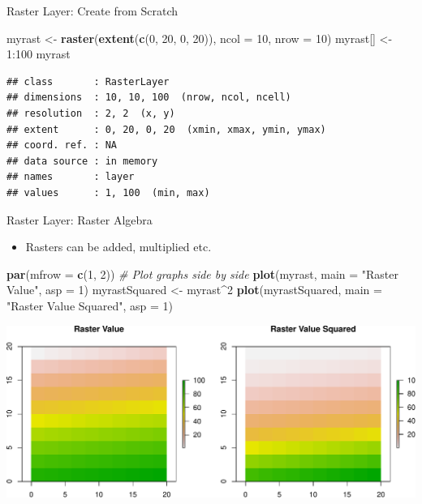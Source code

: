 \documentclass[10pt,ignorenonframetext,]{beamer}
\newenvironment{Shaded}{\begin{snugshade}}{\end{snugshade}}
\newcommand{\KeywordTok}[1]{\textcolor[rgb]{0.13,0.29,0.53}{\textbf{{#1}}}}
\newcommand{\DataTypeTok}[1]{\textcolor[rgb]{0.13,0.29,0.53}{{#1}}}
\newcommand{\DecValTok}[1]{\textcolor[rgb]{0.00,0.00,0.81}{{#1}}}
\newcommand{\StringTok}[1]{\textcolor[rgb]{0.31,0.60,0.02}{{#1}}}
\newcommand{\CommentTok}[1]{\textcolor[rgb]{0.56,0.35,0.01}{\textit{{#1}}}}
\newcommand{\NormalTok}[1]{{#1}}
\providecommand{\tightlist}{%
  \setlength{\itemsep}{0pt}\setlength{\parskip}{0pt}}
\begin{document}
\begin{frame}[fragile]{Raster Layer: Create from Scratch}

\begin{Shaded}
\begin{Highlighting}[]
\NormalTok{myrast <-}\StringTok{ }\KeywordTok{raster}\NormalTok{(}\KeywordTok{extent}\NormalTok{(}\KeywordTok{c}\NormalTok{(}\DecValTok{0}\NormalTok{, }\DecValTok{20}\NormalTok{, }\DecValTok{0}\NormalTok{, }\DecValTok{20}\NormalTok{)), }\DataTypeTok{ncol =} \DecValTok{10}\NormalTok{, }
    \DataTypeTok{nrow =} \DecValTok{10}\NormalTok{)}
\NormalTok{myrast[] <-}\StringTok{ }\DecValTok{1}\NormalTok{:}\DecValTok{100}
\NormalTok{myrast}
\end{Highlighting}
\end{Shaded}

\begin{verbatim}
## class       : RasterLayer 
## dimensions  : 10, 10, 100  (nrow, ncol, ncell)
## resolution  : 2, 2  (x, y)
## extent      : 0, 20, 0, 20  (xmin, xmax, ymin, ymax)
## coord. ref. : NA 
## data source : in memory
## names       : layer 
## values      : 1, 100  (min, max)
\end{verbatim}

\end{frame}

\begin{frame}[fragile]{Raster Layer: Raster Algebra}

\begin{itemize}
\tightlist
\item
  Rasters can be added, multiplied etc.
\end{itemize}

\begin{Shaded}
\begin{Highlighting}[]
\KeywordTok{par}\NormalTok{(}\DataTypeTok{mfrow =} \KeywordTok{c}\NormalTok{(}\DecValTok{1}\NormalTok{, }\DecValTok{2}\NormalTok{))  }\CommentTok{# Plot graphs side by side}
\KeywordTok{plot}\NormalTok{(myrast, }\DataTypeTok{main =} \StringTok{"Raster Value"}\NormalTok{, }\DataTypeTok{asp =} \DecValTok{1}\NormalTok{)}
\NormalTok{myrastSquared <-}\StringTok{ }\NormalTok{myrast^}\DecValTok{2}
\KeywordTok{plot}\NormalTok{(myrastSquared, }\DataTypeTok{main =} \StringTok{"Raster Value Squared"}\NormalTok{, }
    \DataTypeTok{asp =} \DecValTok{1}\NormalTok{)}
\end{Highlighting}
\end{Shaded}

\begin{center}\includegraphics[width=0.8\linewidth]{SpatialDataLecture_files/figure-beamer/plot_rast01-1} \end{center}

\end{frame}
\end{document}
